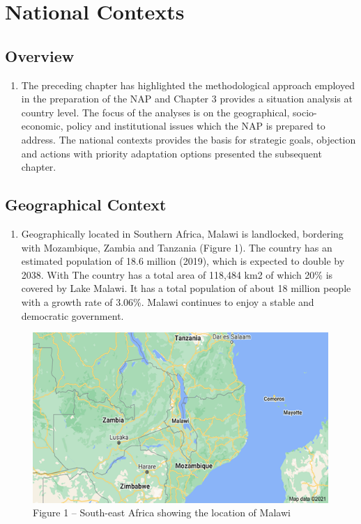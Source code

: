 \documentclass[
]{book}
\providecommand{\tightlist}{%
  \setlength{\itemsep}{0pt}\setlength{\parskip}{0pt}}
\begin{document}
\hypertarget{national-contexts}{%
\chapter{National Contexts}\label{national-contexts}}

\hypertarget{overview}{%
\section{Overview}\label{overview}}

\begin{enumerate}
\def\labelenumi{\arabic{enumi}.}
\setcounter{enumi}{12}
\tightlist
\item
  The preceding chapter has highlighted the methodological approach employed in the preparation of the NAP and Chapter 3 provides a situation analysis at country level. The focus of the analyses is on the geographical, socio-economic, policy and institutional issues which the NAP is prepared to address. The national contexts provides the basis for strategic goals, objection and actions with priority adaptation options presented the subsequent chapter.
\end{enumerate}

\hypertarget{geographical-context}{%
\section{Geographical Context}\label{geographical-context}}

\begin{enumerate}
\def\labelenumi{\arabic{enumi}.}
\setcounter{enumi}{13}
\tightlist
\item
  Geographically located in Southern Africa, Malawi is landlocked, bordering with Mozambique, Zambia and Tanzania (Figure 1). The country has an estimated population of 18.6 million (2019), which is expected to double by 2038. With The country has a total area of 118,484 km2 of which 20\% is covered by Lake Malawi. It has a total population of about 18 million people with a growth rate of 3.06\%. Malawi continues to enjoy a stable and democratic government.
\end{enumerate}

\begin{figure}
\centering
\includegraphics{images/location.png}
\caption{Figure 1 -- South-east Africa showing the location of Malawi}
\end{figure}
\end{document}
